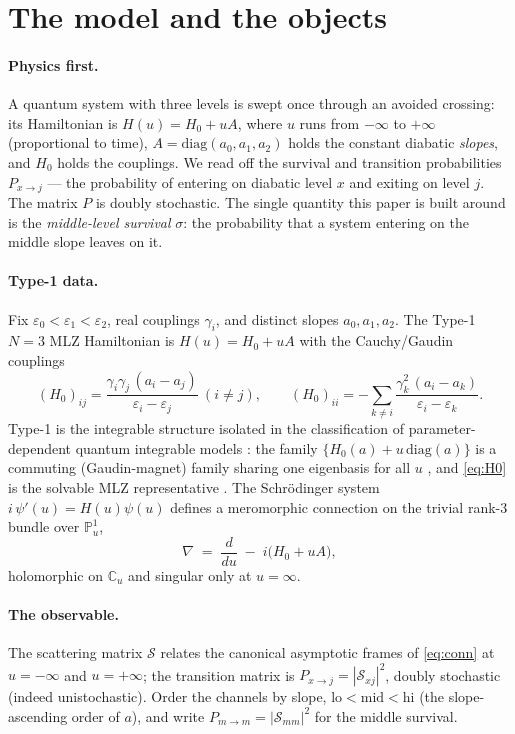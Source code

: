 \documentclass[11pt]{article}
\theoremstyle{definition}
\theoremstyle{remark}
\newcommand{\eps}{\varepsilon}
\newcommand{\C}{\mathbb{C}}
\newcommand{\PP}{\mathbb{P}^1}
\newcommand{\diag}{\mathrm{diag}}
\newcommand{\Scat}{\mathcal{S}}
\newcommand{\Pmid}{P_{m\to m}}
\newcommand{\lo}{\mathrm{lo}}
\newcommand{\mi}{\mathrm{mid}}
\newcommand{\hi}{\mathrm{hi}}
\begin{document}
\section{The model and the objects}\label{sec:model}

\paragraph{Physics first.} A quantum system with three levels is swept once through an
avoided crossing: its Hamiltonian is $H(u)=H_0+uA$, where $u$ runs from $-\infty$ to
$+\infty$ (proportional to time), $A=\diag(a_0,a_1,a_2)$ holds the constant diabatic
\emph{slopes}, and $H_0$ holds the couplings. We read off the survival and transition
probabilities $P_{x\to j}$ --- the probability of entering on diabatic level $x$ and exiting
on level $j$. The matrix $P$ is doubly stochastic. The single quantity this paper is built
around is the \emph{middle-level survival} $\sigma$: the probability that a system entering
on the middle slope leaves on it.

\paragraph{Type-1 data.} Fix $\eps_0<\eps_1<\eps_2$, real couplings $\gamma_i$, and distinct
slopes $a_0,a_1,a_2$. The Type-1 $N{=}3$ MLZ Hamiltonian is $H(u)=H_0+uA$ with the
Cauchy/Gaudin couplings
\begin{equation}\label{eq:H0}
(H_0)_{ij}=\frac{\gamma_i\gamma_j\,(a_i-a_j)}{\eps_i-\eps_j}\ (i\neq j),\qquad
(H_0)_{ii}=-\sum_{k\neq i}\frac{\gamma_k^2\,(a_i-a_k)}{\eps_i-\eps_k}.
\end{equation}
Type-1 is the integrable structure isolated in the classification of parameter-dependent
quantum integrable models \cite{OWY2009,OY2011}: the family
$\{H_0(a)+u\,\diag(a)\}$ is a commuting (Gaudin-magnet) family sharing one eigenbasis for
all $u$ \cite{Y2018}, and \eqref{eq:H0} is the solvable MLZ representative
\cite{SC2017}. The Schr\"odinger system $i\,\psi'(u)=H(u)\psi(u)$ defines a meromorphic
connection on the trivial rank-$3$ bundle over $\PP_u$,
\begin{equation}\label{eq:conn}
\nabla \;=\; \frac{d}{du}\;-\;i\big(H_0+uA\big),
\end{equation}
holomorphic on $\C_u$ and singular only at $u=\infty$.

\paragraph{The observable.} The scattering matrix $\Scat$ relates the canonical asymptotic
frames of \eqref{eq:conn} at $u=-\infty$ and $u=+\infty$; the transition matrix is
$P_{x\to j}=|\Scat_{xj}|^2$, doubly stochastic (indeed unistochastic). Order the channels by
slope, $\lo<\mi<\hi$ (the slope-ascending order of $a$), and write
$\Pmid=|\Scat_{mm}|^2$ for the middle survival.
\end{document}
